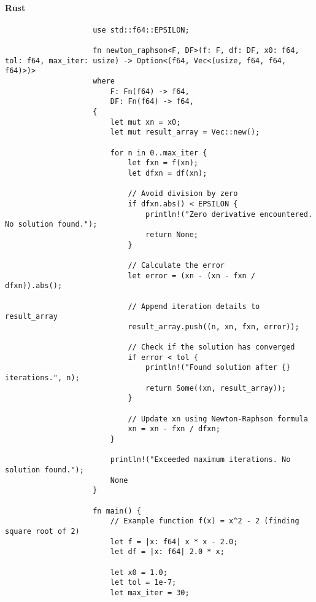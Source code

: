 \documentclass{article}
\begin{document}
            \paragraph{Rust}
                \begin{verbatim}
                    use std::f64::EPSILON;

                    fn newton_raphson<F, DF>(f: F, df: DF, x0: f64, tol: f64, max_iter: usize) -> Option<(f64, Vec<(usize, f64, f64, f64)>)>
                    where
                        F: Fn(f64) -> f64,
                        DF: Fn(f64) -> f64,
                    {
                        let mut xn = x0;
                        let mut result_array = Vec::new();

                        for n in 0..max_iter {
                            let fxn = f(xn);
                            let dfxn = df(xn);

                            // Avoid division by zero
                            if dfxn.abs() < EPSILON {
                                println!("Zero derivative encountered. No solution found.");
                                return None;
                            }

                            // Calculate the error
                            let error = (xn - (xn - fxn / dfxn)).abs();

                            // Append iteration details to result_array
                            result_array.push((n, xn, fxn, error));

                            // Check if the solution has converged
                            if error < tol {
                                println!("Found solution after {} iterations.", n);
                                return Some((xn, result_array));
                            }

                            // Update xn using Newton-Raphson formula
                            xn = xn - fxn / dfxn;
                        }

                        println!("Exceeded maximum iterations. No solution found.");
                        None
                    }

                    fn main() {
                        // Example function f(x) = x^2 - 2 (finding square root of 2)
                        let f = |x: f64| x * x - 2.0;
                        let df = |x: f64| 2.0 * x;

                        let x0 = 1.0;
                        let tol = 1e-7;
                        let max_iter = 30;


\end{verbatim}
\end{document}

